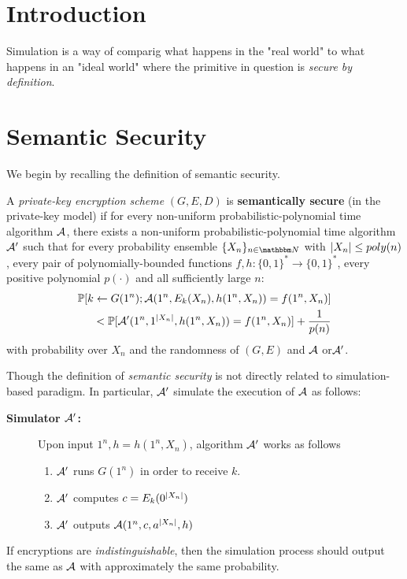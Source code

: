 \vspace*{4mm} 

\section{Introduction}
Simulation is a way of comparig what happens in the "real world" to what happens in an "ideal world" where the primitive in question is {\it secure by definition}.

\section{Semantic Security}
We begin by recalling the definition of semantic security.
\begin{definition} A {\it private-key encryption scheme} $(G,E,D)$ is {\bf semantically secure} (in the private-key model) if for every non-uniform probabilistic-polynomial time algorithm $\mathcal{A}$, there exists a non-uniform probabilistic-polynomial time algorithm $\mathcal{A}'$ such that for every probability ensemble $\{X_n\}_{n\in\N}$ with $\left|X_n\right|\leq poly(n)$, every pair of polynomially-bounded functions $f,h:\{0,1\}^*\to\{0,1\}^*$, every positive polynomial $p(\cdot)$ and all sufficiently large $n$:
\begin{align*}
    \mathop{\mathbb P\/}[k\leftarrow G(1^n);\mathcal{A}(1^n,E_k(X_n), h(1^n,X_n)) = f(1^n, X_n)] \\
    < \mathop{\mathbb P\/}[\mathcal{A}'(1^n,1^{\left|X_n\right|}, h(1^n,X_n)) = f(1^n,X_n) ]+ \frac{1}{p(n)}
\end{align*}
with probability over $X_n$ and the randomness of $(G,E)$ and $\mathcal{A}$ or$\mathcal{A}'$.
\end{definition}
Though the definition of {\it semantic security} is not directly related to simulation-based paradigm. In particular, $\mathcal{A}'$ simulate the execution of $\mathcal{A}$ as follows:
\begin{description}
    \item [\bf Simulator $\mathcal{A}'$:] Upon input $1^n,h=h(1^n,X_n)$, algorithm $\mathcal{A}'$ works as follows
    \begin{enumerate}
        \item $\mathcal{A}'$ runs $G(1^n)$ in order to receive $k$.
        \item $\mathcal{A}'$ computes $c=E_k(0^{\left|X_n\right|})$
        \item $\mathcal{A}'$ outputs $\mathcal{A}(1^n,c,a^{\left|X_n\right|},h)$
    \end{enumerate}
\end{description}
If encryptions are {\it indistinguishable}, then the simulation process should output the same as $\mathcal{A}$ with approximately the same probability.
